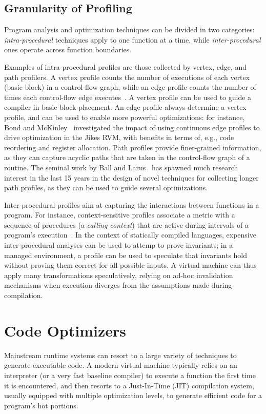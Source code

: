 \subsection*{Granularity of Profiling}

Program analysis and optimization techniques can be divided in two categories: {\em intra-procedural} techniques apply to one function at a time, while {\em inter-procedural} ones operate across function boundaries.

Examples of intra-procedural profiles are those collected by vertex, edge, and path profilers. A vertex profile counts the number of executions of each vertex (basic block) in a control-flow graph, while an edge profile counts the number of times each control-flow edge executes~\cite{Ball94}. A vertex profile can be used to guide a compiler in basic block placement. An edge profile always determine a vertex profile, and can be used to enable more powerful optimizations: for instance, Bond and McKinley~\cite{Bond05} investigated the impact of using continuous edge profiles to drive optimization in the Jikes RVM, with benefits in terms of, e.g., code reordering and register allocation. Path profiles provide finer-grained information, as they can capture acyclic paths that are taken in the control-flow graph of a routine. The seminal work by Ball and Larus~\cite{Ball96} has spawned much research interest in the last 15 years in the design of novel techniques for collecting longer path profiles, as they can be used to guide several optimizations.

Inter-procedural profiles aim at capturing the interactions between functions in a program. For instance, context-sensitive profiles associate a metric with a sequence of procedures (a {\em calling context}) that are active during intervals of a program's execution~\cite{Ammons97}. In the context of statically compiled languages, expensive inter-procedural analyses can be used to attemp to prove invariants; in a managed environment, a profile can be used to speculate that invariants hold without proving them correct for all possible inputs. A virtual machine can thus apply many transformations speculatively, relying on ad-hoc invalidation mechanisms when execution diverges from the assumptions made during compilation.

\section{Code Optimizers}
Mainstream runtime systems can resort to a large variety of techniques to generate executable code. A modern virtual machine typically relies on an interpreter (or a very fast baseline compiler) to execute a function the first time it is encountered, and then resorts to a Just-In-Time (JIT) compilation system, usually equipped with multiple optimization levels, to generate efficient code for a program's hot portions.

